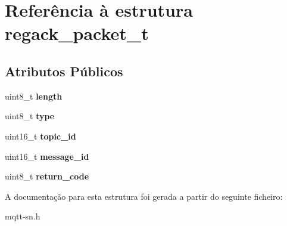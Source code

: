 \hypertarget{structregack__packet__t}{\section{Referência à estrutura regack\+\_\+packet\+\_\+t}
\label{structregack__packet__t}
}
\subsection*{Atributos Públicos}
\begin{DoxyCompactItemize}
\item 
\hypertarget{structregack__packet__t_a11909a83374b649147f861bd354fda0a}{uint8\+\_\+t {\bfseries length}}\label{structregack__packet__t_a11909a83374b649147f861bd354fda0a}

\item 
\hypertarget{structregack__packet__t_ac760ec43a5cd4fb34e442a0ba444d160}{uint8\+\_\+t {\bfseries type}}\label{structregack__packet__t_ac760ec43a5cd4fb34e442a0ba444d160}

\item 
\hypertarget{structregack__packet__t_a08f726124e9b22bd1b09d7e27489eb78}{uint16\+\_\+t {\bfseries topic\+\_\+id}}\label{structregack__packet__t_a08f726124e9b22bd1b09d7e27489eb78}

\item 
\hypertarget{structregack__packet__t_a45df39701c723e80a1cac8cbb28cc429}{uint16\+\_\+t {\bfseries message\+\_\+id}}\label{structregack__packet__t_a45df39701c723e80a1cac8cbb28cc429}

\item 
\hypertarget{structregack__packet__t_ad4da081ecf282fcf4e99eff4b76fa42c}{uint8\+\_\+t {\bfseries return\+\_\+code}}\label{structregack__packet__t_ad4da081ecf282fcf4e99eff4b76fa42c}

\end{DoxyCompactItemize}


A documentação para esta estrutura foi gerada a partir do seguinte ficheiro\+:\begin{DoxyCompactItemize}
\item 
mqtt-\/sn.\+h\end{DoxyCompactItemize}
